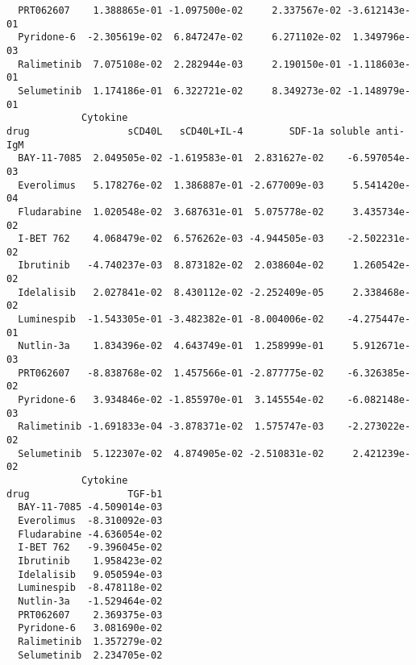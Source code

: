 \documentclass[11pt, a4paper, twosided]{book}
\begin{document}
\begin{verbatim}
  PRT062607    1.388865e-01 -1.097500e-02     2.337567e-02 -3.612143e-01
  Pyridone-6  -2.305619e-02  6.847247e-02     6.271102e-02  1.349796e-03
  Ralimetinib  7.075108e-02  2.282944e-03     2.190150e-01 -1.118603e-01
  Selumetinib  1.174186e-01  6.322721e-02     8.349273e-02 -1.148979e-01
             Cytokine
drug                 sCD40L   sCD40L+IL-4        SDF-1a soluble anti-IgM
  BAY-11-7085  2.049505e-02 -1.619583e-01  2.831627e-02    -6.597054e-03
  Everolimus   5.178276e-02  1.386887e-01 -2.677009e-03     5.541420e-04
  Fludarabine  1.020548e-02  3.687631e-01  5.075778e-02     3.435734e-02
  I-BET 762    4.068479e-02  6.576262e-03 -4.944505e-03    -2.502231e-02
  Ibrutinib   -4.740237e-03  8.873182e-02  2.038604e-02     1.260542e-02
  Idelalisib   2.027841e-02  8.430112e-02 -2.252409e-05     2.338468e-02
  Luminespib  -1.543305e-01 -3.482382e-01 -8.004006e-02    -4.275447e-01
  Nutlin-3a    1.834396e-02  4.643749e-01  1.258999e-01     5.912671e-03
  PRT062607   -8.838768e-02  1.457566e-01 -2.877775e-02    -6.326385e-02
  Pyridone-6   3.934846e-02 -1.855970e-01  3.145554e-02    -6.082148e-03
  Ralimetinib -1.691833e-04 -3.878371e-02  1.575747e-03    -2.273022e-02
  Selumetinib  5.122307e-02  4.874905e-02 -2.510831e-02     2.421239e-02
             Cytokine
drug                 TGF-b1
  BAY-11-7085 -4.509014e-03
  Everolimus  -8.310092e-03
  Fludarabine -4.636054e-02
  I-BET 762   -9.396045e-02
  Ibrutinib    1.958423e-02
  Idelalisib   9.050594e-03
  Luminespib  -8.478118e-02
  Nutlin-3a   -1.529464e-02
  PRT062607    2.369375e-03
  Pyridone-6   3.081690e-02
  Ralimetinib  1.357279e-02
  Selumetinib  2.234705e-02
\end{verbatim}
\end{document}
